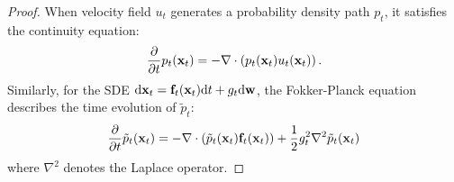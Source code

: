 \begin{proof}
\label{proof:prop1}
When velocity field $u_t$ generates a probability density path $p_t$, it satisfies the continuity equation:
\begin{align}
\label{eq:continuity equation}
    \frac{\partial}{\partial t}p_t(\mathbf{x}_t)=-\nabla\cdot\left(p_t(\mathbf{x}_t)u_t(\mathbf{x}_t)\right).
\end{align}
Similarly, for the SDE $\mathrm{d} \mathbf{x}_t=\mathbf{f}_t(\mathbf{x}_t) \mathrm{d} t + g_t \mathrm{d} \mathbf{w}$, the Fokker-Planck equation describes the time evolution of $\tilde{p}_t$:
\begin{align}
\label{eq:fokker planck}
    \frac{\partial}{\partial t}\tilde{p}_t(\mathbf{x}_t)=-\nabla\cdot (\tilde{p}_t(\mathbf{x}_t)\mathbf{f}_t(\mathbf{x}_t))+\frac{1}{2}g_t^2\nabla^2\tilde{p}_t(\mathbf{x}_t)
\end{align}
where $\nabla^2$ denotes the Laplace operator. 


\end{proof}
